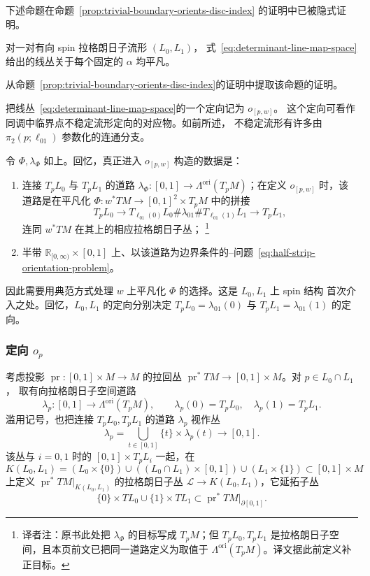 下述命题在命题~\ref{prop:trivial-boundary-orients-disc-index} 的证明中已被隐式证明。

\begin{proposition}
\label{prop:determinant-line-trivial-spin-pair}
对一对有向 spin 拉格朗日子流形 $(L_0,L_1)$，
式~\eqref{eq:determinant-line-map-space}给出的线丛关于每个固定的
$\alpha$ 均平凡。
\end{proposition}

\begin{exercise}
\label{ex:extract-spin-triviality-proof}
从命题~\ref{prop:trivial-boundary-orients-disc-index}的证明中提取该命题的证明。
\end{exercise}

把线丛~\eqref{eq:determinant-line-map-space}的一个定向记为 $o_{[p,w]}$。
这个定向可看作\personMorse{}同调中临界点不稳定流形定向的对应物。如前所述，
不稳定流形有许多由 $\pi_2(p;\ell_{01})$ 参数化的连通分支。

令 $\Phi,\lambda_\Phi$ 如上。回忆，真正进入 $o_{[p,w]}$ 构造的数据是：
\begin{enumerate}[label=(\arabic*)]
\item 连接 $T_pL_0$ 与 $T_pL_1$ 的道路
$\lambda_\Phi:[0,1]\to\Lambda^{\mathrm{ori}}(T_pM)$；在定义 $o_{[p,w]}$ 时，该道路是在平凡化
$\Phi:w^*TM\to[0,1]^2\times T_pM$ 中的拼接
\[
 T_pL_0\longrightarrow T_{\ell_{01}(0)}L_0
 \#\lambda_{01}\#T_{\ell_{01}(1)}L_1\longrightarrow T_pL_1,
\]
连同 $w^*TM$ 在其上的相应拉格朗日子丛；
\footnote{译者注：原书此处把 $\lambda_\Phi$ 的目标写成 $T_pM$；但
$T_pL_0,T_pL_1$ 是拉格朗日子空间，且本页前文已把同一道路定义为取值于
$\Lambda^{\mathrm{ori}}(T_pM)$。译文据此前定义补正目标。}
\item 半带 $\mathbb R_{[0,\infty)}\times[0,1]$ 上、以该道路为边界条件的\personRiemann{}--\personHilbert{}问题~\eqref{eq:half-strip-orientation-problem}。
\end{enumerate}
因此需要用典范方式处理 $w$ 上平凡化 $\Phi$ 的选择。这是 $L_0,L_1$ 上 spin 结构
首次介入之处。回忆，$L_0,L_1$ 的定向分别决定
$T_pL_0=\lambda_{01}(0)$ 与 $T_pL_1=\lambda_{01}(1)$ 的定向。

\subsubsection*{定向 $o_p$}
考虑投影 $\operatorname{pr}:[0,1]\times M\to M$ 的拉回丛
$\operatorname{pr}^*TM\to[0,1]\times M$。对 $p\in L_0\cap L_1$，
取有向拉格朗日子空间道路
\[
 \lambda_p:[0,1]\longrightarrow\Lambda^{\mathrm{ori}}(T_pM),
 \qquad
 \lambda_p(0)=T_pL_0,
 \quad\lambda_p(1)=T_pL_1.
\]
滥用记号，也把连接 $T_pL_0,T_pL_1$ 的道路 $\lambda_p$ 视作丛
\[
 \lambda_p=\bigcup_{t\in[0,1]}\{t\}\times\lambda_p(t)\longrightarrow[0,1].
\]
该丛与 $i=0,1$ 时的 $[0,1]\times T_pL_i$ 一起，在
\[
 K(L_0,L_1)=(L_0\times\{0\})
 \cup((L_0\cap L_1)\times[0,1])
 \cup(L_1\times\{1\})\subset[0,1]\times M
\]
上定义 $\operatorname{pr}^*TM|_{K(L_0,L_1)}$ 的拉格朗日子丛
$\mathcal L\to K(L_0,L_1)$，它延拓子丛
\[
 \{0\}\times TL_0\cup\{1\}\times TL_1
 \subset\operatorname{pr}^*TM|_{\partial[0,1]}.
\]


